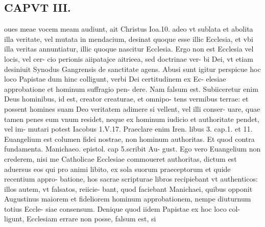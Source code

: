 \documentclass{article}
\begin{document}
\begin{pages}
\section*{CAPVT  III. }
\marginpar{[ p.172 ]}\pstart oues meae vocem meam audiunt, ait Christus Ioa.10. adeo vt sublata et abolita illa veritate, vel mutata in mendacium, desinat quoque esse illic Ecclesia, et vbi illa veritas annuntiatur, illic quoque nascitur Ecclesia. Ergo non est Ecclesia vel locis, vel cer- cio perionis aiipatajce aitrieea, sed doctrinae ver- bi Dei, vt etiam desiniuit Synodus Gangrensis de sanctitate agens.  \pend\pstart Abusi sunt igitur perspicue hoc loco Papistae dum hinc colligunt, verbi Dei certitudinem ex Ec- elesiae approbatione et hominum suffragio pen- dere. Nam falsum est. Subiiceretur enim Deus hominibus, id est, creator creaturae, et omnipo- tens vermibus terrae: et possent homines suam Deo veritatem adimere si vellent, vel illi conser- uare, quae tamen penes eum vnum residet, neque ex hominum iudicio et authoritate pendet, vel im- mutari potest Iacobus 1.V.17. Praeclare enim Iren. libus 3. cap.1. et 11. Euangelium est columen fidei nostrae, non hominum authoritas. Et quod contra fundamenta. Manichaeo. epistol. cap 5.scribit Au- gust. Ego vero Euangelium non crederem, nisi me Catholicae Ecclesiae commoueret authoritas, dictum est aduersus eos qui pro animi libito, ex sola suorum praeceptorum et quide recentium appro- batione, hos sacrae scripturae libros recipiebant vt authenticos: illos autem, vt falsatos, reiicie- bant, quod faciebant Manichaei, quibus opponit Augustinus maiorem et fideliorem hominum approbationem, nempe diuturnum totius Eccle- siae consensum.  \pend\pstart Denique quod iidem Papistae ex hoc loco col- ligunt, Ecclesiam errare non posse, falsum est, si  \pend

\end{pages}
\end{document}
